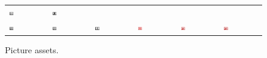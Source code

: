 \documentclass[book.tex]{subfiles}
\begin{document}
\begin{figure}[H]
\begin{table}[H]
\begin{tabularx}{\textwidth}[c]{XXXXXX}
  \includegraphics[width=0.15\textwidth]{screenshots_300dpi/game/picture17.png} &
  \includegraphics[width=0.15\textwidth]{screenshots_300dpi/game/picture18.png} \\
  \includegraphics[width=0.15\textwidth]{screenshots_300dpi/game/picture19.png} &
  \includegraphics[width=0.15\textwidth]{screenshots_300dpi/game/picture20.png} &
  \includegraphics[width=0.15\textwidth]{screenshots_300dpi/game/picture21.png} &
  \includegraphics[width=0.15\textwidth]{screenshots_300dpi/game/picture22.png} &
  \includegraphics[width=0.15\textwidth]{screenshots_300dpi/game/picture23.png} &
  \includegraphics[width=0.15\textwidth]{screenshots_300dpi/game/picture24.png} \\
  \end{tabularx}
  \end{table}
  \caption{Picture assets.}
  \label{fig:picture_assets}
 \end{figure} 
 
\end{document}
